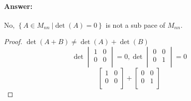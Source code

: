 \documentclass[12pt]{article}
\begin{document}
\begin{enumerate}
\begin{enumerate}
                            \paragraph{Answer:} No, ${ \left\{A \in M_{nn} \
                                                    | \det (A) = 0 \right\}}$ is not a sub pace of $M_{nn}$.
                            \begin{proof}
                                    $\det(A+B) \neq \det (A)+\det (B)$
                                    \begin{equation*}
                                            \det
                                            \begin{vmatrix}
                                                    {1} & {0} \\
                                                    {0} & {0} \\
                                            \end{vmatrix}
                                            {= 0},
                                            \det
                                            \begin{vmatrix}
                                                    {0} & {0} \\
                                                    {0} & {1} \\
                                            \end{vmatrix}
                                            = 0
                                    \end{equation*}
                                    \begin{equation*}
                                            \begin{bmatrix}
                                                    {1} & {0} \\
                                                    {0} & {0} \\
                                            \end{bmatrix}
                                            +
                                            \begin{bmatrix}
                                                    {0} & {0} \\
                                                    {0} & {1} \\
                                            \end{bmatrix}

\end{equation*}
\end{proof}
\end{enumerate}
\end{enumerate}
\end{document}
